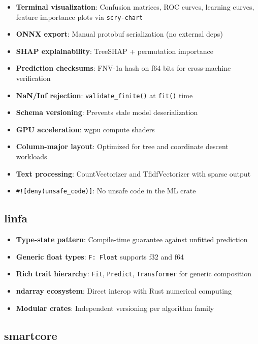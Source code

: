 \documentclass[11pt,a4paper]{article}
\begin{document}
\begin{itemize}[itemsep=2pt]
\item \textbf{Terminal visualization}: Confusion matrices, ROC curves, learning curves, feature importance plots via \texttt{scry-chart}
\item \textbf{ONNX export}: Manual protobuf serialization (no external deps)
\item \textbf{SHAP explainability}: TreeSHAP + permutation importance
\item \textbf{Prediction checksums}: FNV-1a hash on f64 bits for cross-machine verification
\item \textbf{NaN/Inf rejection}: \texttt{validate\_finite()} at \texttt{fit()} time
\item \textbf{Schema versioning}: Prevents stale model deserialization
\item \textbf{GPU acceleration}: wgpu compute shaders
\item \textbf{Column-major layout}: Optimized for tree and coordinate descent workloads
\item \textbf{Text processing}: CountVectorizer and TfidfVectorizer with sparse output
\item \texttt{\#![deny(unsafe\_code)]}: No unsafe code in the ML crate
\end{itemize}

\subsection{linfa}

\begin{itemize}[itemsep=2pt]
\item \textbf{Type-state pattern}: Compile-time guarantee against unfitted prediction
\item \textbf{Generic float types}: \texttt{F: Float} supports f32 and f64
\item \textbf{Rich trait hierarchy}: \texttt{Fit}, \texttt{Predict}, \texttt{Transformer} for generic composition
\item \textbf{ndarray ecosystem}: Direct interop with Rust numerical computing
\item \textbf{Modular crates}: Independent versioning per algorithm family
\end{itemize}

\subsection{smartcore}
\end{document}

